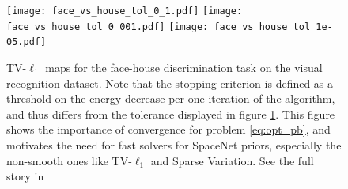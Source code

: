 \begin{figure}[!htb]
    \texttt{[image: face\_vs\_house\_tol\_0\_1.pdf]}%
\hfill%
\texttt{[image: face\_vs\_house\_tol\_0\_001.pdf]}%
\hfill%
\texttt{[image: face\_vs\_house\_tol\_1e-05.pdf]}%
%

\caption{TV-$\ell_1$ maps for the face-house discrimination task on
  the visual recognition dataset.
  Note that
  the stopping criterion is defined as a threshold on the energy
  decrease per one iteration of the algorithm, and thus differs from
  the tolerance displayed in figure \ref{Fig:benchmarks_prni}.  This figure shows
  the importance of convergence for problem \eqref{eq:opt_pb}, and motivates
  the need for fast solvers for SpaceNet priors, especially the non-smooth ones like TV-$\ell_1$ and Sparse Variation. See the full story in
 \citep{dohmatob2014benchmarking}}
  \label{Fig:benchmarks_prni}
\end{figure}

  

